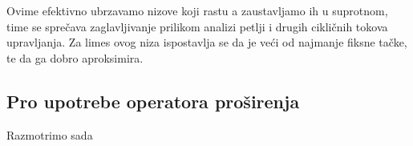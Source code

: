 Ovime efektivno ubrzavamo nizove koji rastu a zaustavljamo ih u suprotnom, time se sprečava zaglavljivanje prilikom analizi petlji i drugih cikličnih tokova upravljanja. Za limes ovog niza ispostavlja se da je veći od najmanje fiksne tačke, te da ga dobro aproksimira. 

\subsection{Pro upotrebe operatora proširenja}
\label{subsec:widening}

Razmotrimo sada 


